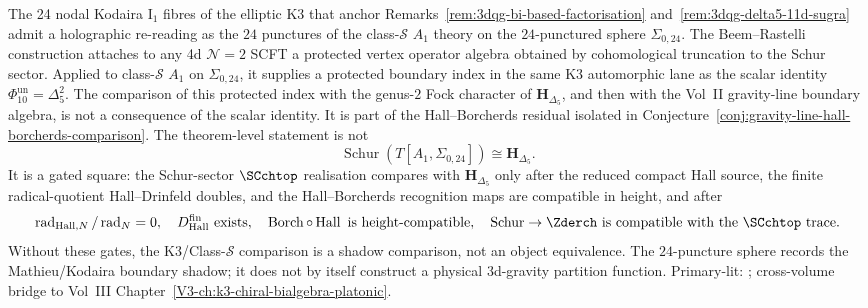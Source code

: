 \begin{remark}[Class-$\mathcal{S}$ $A_1$ on
$\Sigma_{0,24}$ as the 4d $\mathcal{N}{=}2$ parent of the 3d-gravity
climax]
\label{rem:3dqg-class-S-a1-24punctures}%
%
%
%
%
The 24 nodal Kodaira I$_1$ fibres of the elliptic K3 that anchor
Remarks~\ref{rem:3dqg-bi-based-factorisation}
and~\ref{rem:3dqg-delta5-11d-sugra} admit a holographic
re-reading as the $24$ punctures of the class-$\mathcal{S}$ $A_1$
theory on the $24$-punctured sphere $\Sigma_{0,24}$. The
Beem--Rastelli construction
\cite{BeemRastelli2018,BeemLemosLiendoPeelaersRastelliVanRees2015}
attaches to any 4d $\mathcal{N}{=}2$ SCFT a protected vertex
operator algebra obtained by cohomological truncation to the
Schur sector. Applied to class-$\mathcal{S}$ $A_1$ on
$\Sigma_{0,24}$, it supplies a protected boundary index in the
same K3 automorphic lane as the scalar identity
\(\Phi_{10}^{\mathrm{un}}=\Delta_5^2\). The comparison of this protected index
with the genus-$2$ Fock character of
\(\mathbf H_{\Delta_5}\), and then with the Vol~II gravity-line
boundary algebra, is not a consequence of the scalar identity.
It is part of the Hall--Borcherds residual isolated in
Conjecture~\ref{conj:gravity-line-hall-borcherds-comparison}.
The theorem-level statement is not
\[
\operatorname{Schur}\!\left(T[A_1,\Sigma_{0,24}]\right)
\cong \mathbf H_{\Delta_5}.
\]
It is a gated square: the Schur-sector \(\SCchtop\) realisation
compares with \(\mathbf H_{\Delta_5}\) only after the reduced compact
Hall source, the finite radical-quotient Hall--Drinfeld doubles, and
the Hall--Borcherds recognition maps are compatible in height, and
after
\[
\operatorname{rad}_{\mathrm{Hall},N}/\operatorname{rad}_{N}=0,\quad
D^{\mathrm{fin}}_{\mathrm{Hall}}\ \text{exists},\quad
\operatorname{Borch}\circ\operatorname{Hall}\ \text{is height-compatible},
\quad
\operatorname{Schur}\to\Zderch\ \text{is compatible with the }\SCchtop
\text{ trace}.
\]
Without these gates, the K3/Class-\(\mathcal S\) comparison is a
shadow comparison, not an object equivalence.
The \(24\)-puncture sphere records the Mathieu/Kodaira boundary
shadow; it does not by itself construct a physical
\(3\)d-gravity partition function. Primary-lit: \cite{BeemRastelli2018,
BeemLemosLiendoPeelaersRastelliVanRees2015,Gaiotto2012,
CordovaShao2016}; cross-volume bridge to
Vol~III Chapter~\ref*{V3-ch:k3-chiral-bialgebra-platonic}.
\end{remark}

